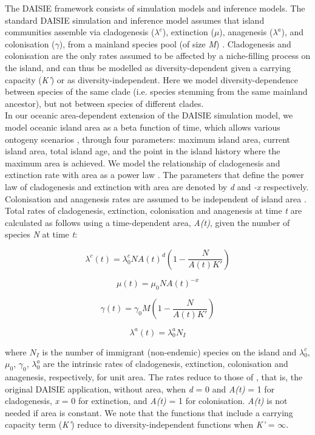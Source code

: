 \documentclass{article}
\begin{document}
The DAISIE framework consists of simulation models and inference models. The standard DAISIE simulation and inference model assumes that island communities assemble via cladogenesis ($\lambda^c$), extinction ($\mu$), anagenesis ($\lambda^a$), and colonisation ($\gamma$), from a mainland species pool (of size \textit{M}) \citep{valente_equilibrium_2015}. Cladogenesis and colonisation are the only rates assumed to be affected by a niche-filling process on the island, and can thus be modelled as diversity-dependent given a carrying capacity (\textit{K’}) \citep{etienne_diversity-dependence_2012, valente_equilibrium_2015} or as diversity-independent. Here we model diversity-dependence between species of the same clade (i.e. species stemming from the same mainland ancestor), but not between species of different clades. \\

In our oceanic area-dependent extension of the DAISIE simulation model, we model oceanic island area as a beta function of time, which allows various ontogeny scenarios \citep{valente_effects_2014}, through four parameters: maximum island area, current island area, total island age, and the point in the island history where the maximum area is achieved. We model the relationship of cladogenesis and extinction rate with area as a power law \citep{valente_simple_2020}. The parameters that define the power law of cladogenesis and extinction with area are denoted by \textit{d} and \textit{-x} respectively. Colonisation and anagenesis rates are assumed to be independent of island area \citep{valente_simple_2020}. Total rates of cladogenesis, extinction, colonisation and anagenesis at time \textit{t} are calculated as follows using a time-dependent area, \textit{A(t)}, given the number of species \textit{N} at time \textit{t}:

\[ \lambda^c (t) = \lambda^c_0 N A(t)^d \left( 1- \frac{N}{A(t)K'} \right) \]

\[ \mu (t) = \mu_0 N A(t)^{-x} \]

\[ \gamma (t) = \gamma_0 M \left( 1- \frac{N}{A(t)K'} \right) \]
 
\[ \lambda^a (t) = \lambda^a_0 N_I \]

where $N_I$ is the number of immigrant (non-endemic) species on the island and $\lambda^c_0$, $\mu_0$, $\gamma_0$, $\lambda^a_0$ are the intrinsic rates of cladogenesis, extinction, colonisation and anagenesis, respectively, for unit area. The rates reduce to those of \cite{valente_equilibrium_2015}, that is, the original DAISIE application, without area, when \textit{d} = 0 and \textit{A(t)} = 1 for cladogenesis, \textit{x} = 0 for extinction, and \textit{A(t)} = 1 for colonisation. \textit{A(t)} is not needed if area is constant. We note that the functions that include a carrying capacity term (\textit{K’}) reduce to diversity-independent functions when \textit{K’} = $\infty$. \\
\end{document}
